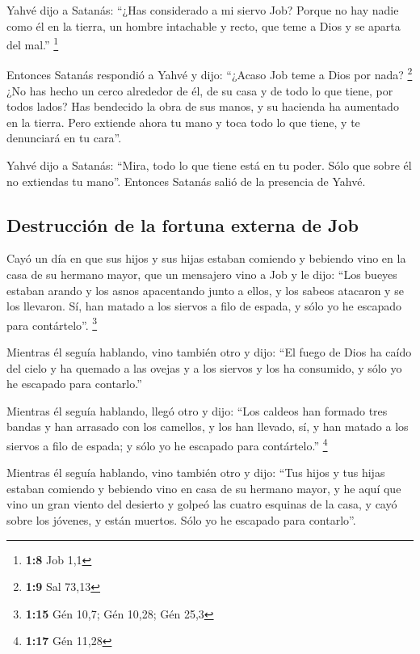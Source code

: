  Yahvé dijo a Satanás: ``¿Has considerado a mi siervo Job?
Porque no hay nadie como él en la tierra, un hombre intachable y recto,
que teme a Dios y se aparta del mal.'' \footnote{\textbf{1:8} Job 1,1}

 Entonces Satanás respondió a Yahvé y dijo: ``¿Acaso Job
teme a Dios por nada? \footnote{\textbf{1:9} Sal 73,13} 
¿No has hecho un cerco alrededor de él, de su casa y de todo lo que
tiene, por todos lados? Has bendecido la obra de sus manos, y su
hacienda ha aumentado en la tierra.  Pero extiende ahora
tu mano y toca todo lo que tiene, y te denunciará en tu cara''.

 Yahvé dijo a Satanás: ``Mira, todo lo que tiene está en
tu poder. Sólo que sobre él no extiendas tu mano''. Entonces Satanás
salió de la presencia de Yahvé.

\hypertarget{destrucciuxf3n-de-la-fortuna-externa-de-job}{%
\subsection{Destrucción de la fortuna externa de
Job}\label{destrucciuxf3n-de-la-fortuna-externa-de-job}}

 Cayó un día en que sus hijos y sus hijas estaban
comiendo y bebiendo vino en la casa de su hermano mayor, 
que un mensajero vino a Job y le dijo: ``Los bueyes estaban arando y los
asnos apacentando junto a ellos,  y los sabeos atacaron y
se los llevaron. Sí, han matado a los siervos a filo de espada, y sólo
yo he escapado para contártelo''. \footnote{\textbf{1:15} Gén 10,7; Gén
  10,28; Gén 25,3}

 Mientras él seguía hablando, vino también otro y dijo:
``El fuego de Dios ha caído del cielo y ha quemado a las ovejas y a los
siervos y los ha consumido, y sólo yo he escapado para contarlo.''

 Mientras él seguía hablando, llegó otro y dijo: ``Los
caldeos han formado tres bandas y han arrasado con los camellos, y los
han llevado, sí, y han matado a los siervos a filo de espada; y sólo yo
he escapado para contártelo.'' \footnote{\textbf{1:17} Gén 11,28}

 Mientras él seguía hablando, vino también otro y dijo:
``Tus hijos y tus hijas estaban comiendo y bebiendo vino en casa de su
hermano mayor,  y he aquí que vino un gran viento del
desierto y golpeó las cuatro esquinas de la casa, y cayó sobre los
jóvenes, y están muertos. Sólo yo he escapado para contarlo''.

